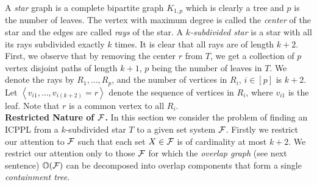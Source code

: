 \documentclass[envcountsect, envcountsame, 11pt]{../lib/llncs2e/llncs}
\def\cF{{\cal F}}
\def\bO{\mathbb O}
\def\xnoindent{\noindent} %
\newcommand{\seq}[1]{\left\langle #1 \right\rangle}
\begin{document}
\xnoindent {\bf $k$-subdivided star.} A {\em star} graph
is a complete bipartite graph $K_{1,p}$ which is clearly a tree and
$p$ is the number of leaves. The vertex with maximum degree is called
the {\em center} of the star and the edges are called {\em rays} of
the star. A {\em $k$-subdivided star} is a star with all its rays
subdivided exactly $k$ times.   It is clear that all rays are of length $k+2$.
First, we observe
that by removing the center $r$ from $T$, we get a collection of $p$
vertex disjoint paths of length $k+1$, $p$ being the number of leaves
in $T$.  We denote the rays by $R_1, \ldots, R_p$, and the number of
vertices in $R_i$, $i \in [p]$ is $k+2$.  Let
$\seq{v_{i1},\ldots,v_{i(k+2)}=r}$ denote the sequence of vertices in
$R_i$, where $v_{i1}$ is the leaf. Note that $r$ is a common vertex to
all $R_i$.\\

\noindent
{\bf Restricted Nature of $\cF$.}
In this section we consider the problem of finding an ICPPL from a
$k$-subdivided star $T$ to a given set system $\cF$.  Firstly we restrict our attention to $\cF$ 
 such that each set $X \in \cF$ is of cardinality at most $k+2$.  
We restrict our attention only to those $\cF$ for which the {\em overlap graph} (see next sentence) $\bO(\cF)$ 
can be decomposed into overlap components that form a single {\em  containment tree}. 
\end{document}
